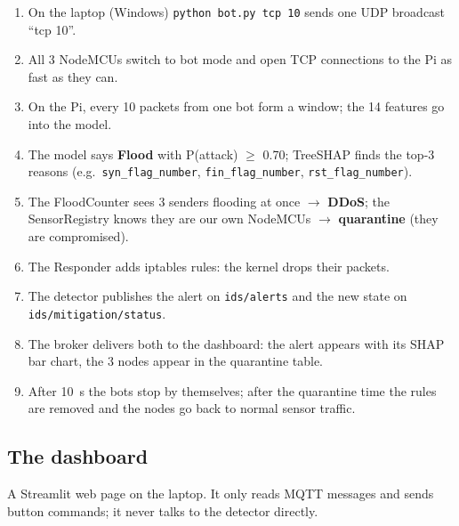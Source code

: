 \documentclass[11pt,a4paper]{article}
\newcommand{\file}[1]{\texttt{\small #1}}
\begin{document}
\begin{enumerate}
  \item On the laptop (Windows) \file{python bot.py tcp 10} sends one UDP broadcast ``tcp 10''.
  \item All 3 NodeMCUs switch to bot mode and open TCP connections to the Pi as fast as they can.
  \item On the Pi, every 10 packets from one bot form a window; the 14 features go into the model.
  \item The model says \textbf{Flood} with P(attack) $\geq$ 0.70; TreeSHAP finds the top-3 reasons
        (e.g.\ \file{syn\_flag\_number}, \file{fin\_flag\_number}, \file{rst\_flag\_number}).
  \item The FloodCounter sees 3 senders flooding at once $\rightarrow$ \textbf{DDoS}; the SensorRegistry knows they
        are our own NodeMCUs $\rightarrow$ \textbf{quarantine} (they are compromised).
  \item The Responder adds iptables rules: the kernel drops their packets.
  \item The detector publishes the alert on \file{ids/alerts} and the new state on \file{ids/mitigation/status}.
  \item The broker delivers both to the dashboard: the alert appears with its SHAP bar chart, the 3 nodes appear in
        the quarantine table.
  \item After 10~s the bots stop by themselves; after the quarantine time the rules are removed and the nodes go back
        to normal sensor traffic.
\end{enumerate}

\subsection{The dashboard}

A Streamlit web page on the laptop. It only reads MQTT messages and sends button commands; it never talks to the
detector directly.
\end{document}
